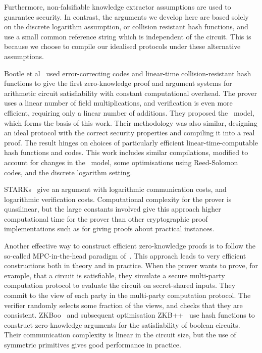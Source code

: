 Furthermore, non-falsifiable knowledge extractor assumptions are used to guarantee security.  In contrast, the arguments we develop here are based solely on the discrete logarithm assumption, or collision resistant hash functions, and use a small common reference string which is independent of the circuit. This is because we choose to compile our idealised protocols under these alternative assumptions.

Bootle et al~\cite{BootleCGGHJ17} used error-correcting codes and linear-time collision-resistant hash functions to give the first zero-knowledge proof and argument systems for arithmetic circuit satisfiability with constant computational overhead.  The prover uses a linear number of field multiplications, and verification is even more efficient, requiring only a linear number of additions. They proposed the \ILC\ model, which forms the basis of this work. Their methodology was also similar, designing an ideal protocol with the correct security properties and compiling it into a real proof. The result hinges on choices of particularly efficient linear-time-computable hash functions and codes. This work includes similar compilations, modified to account for changes in the \ILC\ model, some optimisations using Reed-Solomon codes, and the discrete logarithm setting.

STARKs~\cite{Ben-SassonBHR18} give an argument with logarithmic communication costs, and logarithmic verification costs. Computational complexity for the prover is quasilinear, but the large constants involved give this approach higher computational time for the prover than other cryptographic proof implementations such as \cite{BunzBBPWM18,WahbyTSTW18} for giving proofs about practical instances.

Another effective way to construct efficient zero-knowledge proofs is to follow the so-called MPC-in-the-head paradigm of~\cite{IshaiKOS07}. This approach leads to very efficient constructions both in theory and in practice. When the prover wants to prove, for example, that a circuit is satisfiable, they simulate a secure multi-party computation protocol to evaluate the circuit on secret-shared inputs. They commit to the view of each party in the multi-party computation protocol. The verifier randomly selects some fraction of the views, and checks that they are consistent. ZKBoo~\cite{USENIX:GiaMadOrl16} and subsequent optimisation ZKB++~\cite{CCS:CDGORR17} use hash functions to construct zero-knowledge arguments for the satisfiability of boolean circuits. Their communication complexity is linear in the circuit size, but the use of symmetric primitives gives good performance in practice.

